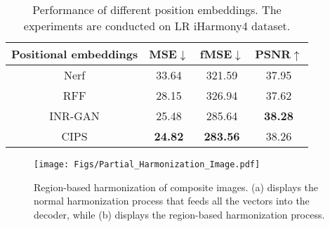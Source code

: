 \documentclass[10pt,journal,twocolumn,twoside]{IEEEtran}
\begin{document}
\begin{table}[!ht]
\caption{Performance of different position embeddings. The experiments are conducted on LR iHarmony4 dataset.}
    \label{tab:Positonal embeddings}
\centering
\begin{tabular}{c|ccc}
\hline
Positional embeddings & MSE$\downarrow$            & fMSE$\downarrow$            & PSNR$\uparrow$           \\ \hline
Nerf\cite{mildenhall2021nerf}                  & 33.64          & 321.59          & 37.95          \\
RFF\cite{tancik2020fourier}               & 28.15          & 326.94          & 37.62          \\
INR-GAN\cite{skorokhodov2021adversarial}                & 25.48          & 285.64          & \textbf{38.28} \\
CIPS\cite{anokhin2021image}                  & \textbf{24.82} & \textbf{283.56} & 38.26          \\ \hline
\end{tabular}
    
\end{table}

\begin{table}[!ht]
\caption{Performance of different 3D LUT dimensions. The experiments are conducted on LR iHarmony4 dataset.}
    \label{tab:3D LUT dimensions}
\centering
    
\end{table}

\begin{figure}[t]
  \centering
   \texttt{[image: Figs/Partial\_Harmonization\_Image.pdf]}
   \caption{Region-based harmonization of composite images. (a) displays the normal harmonization process that feeds all the vectors into the decoder, while (b) displays the region-based harmonization process.}
   \label{fig:Partial_Harmonization_Image}
\end{figure}
\end{document}

